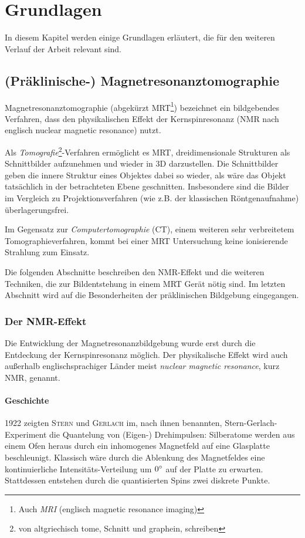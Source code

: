 \chapter{Grundlagen}
In diesem Kapitel werden einige Grundlagen erläutert, die für den weiteren Verlauf der Arbeit relevant sind.

\section{(Präklinische-) Magnetresonanztomographie}
Magnetresonanztomographie (abgekürzt MRT\footnote{Auch \textit{MRI} (englisch magnetic resonance imaging)}) bezeichnet ein bildgebendes Verfahren, dass den physikalischen Effekt der Kernspinresonanz (NMR nach englisch nuclear magnetic resonance) nutzt.

Als \textit{Tomografie}\footnote{von altgriechisch tome, Schnitt und graphein, schreiben}-Verfahren ermöglicht es MRT, dreidimensionale Strukturen als Schnittbilder aufzunehmen und wieder in 3D darzustellen. Die Schnittbilder geben die innere Struktur eines Objektes dabei so wieder, als wäre das Objekt tatsächlich in der betrachteten Ebene geschnitten. Insbesondere sind die Bilder im Vergleich zu Projektionsverfahren (wie z.B. der klassischen Röntgenaufnahme) überlagerungsfrei.

Im Gegensatz zur \textit{Computertomographie} (CT), einem weiteren sehr verbreitetem Tomographieverfahren, kommt bei einer MRT Untersuchung keine ionisierende Strahlung zum Einsatz.

Die folgenden Abschnitte beschreiben den NMR-Effekt und die weiteren Techniken, die zur Bildentstehung in einem MRT Gerät nötig sind. Im letzten Abschnitt wird auf die Besonderheiten der präklinischen Bildgebung eingegangen.

\subsection{Der NMR-Effekt}
Die Entwicklung der Magnetresonanzbildgebung wurde erst durch die Entdeckung der Kernspinresonanz möglich. Der physikalische Effekt wird auch außerhalb englischsprachiger Länder meist \textit{nuclear magnetic resonance}, kurz NMR, genannt.

\subsubsection{Geschichte}
1922 zeigten \textsc{Stern} und \textsc{Gerlach} im, nach ihnen benannten, Stern-Gerlach-Experiment die Quantelung von (Eigen-) Drehimpulsen: Silberatome werden aus einem Ofen heraus durch ein inhomogenes Magnetfeld auf eine Glasplatte beschleunigt. Klassisch wäre durch die Ablenkung des Magnetfeldes eine kontinuierliche Intensitäts-Verteilung um $0\degree$ auf der Platte zu erwarten. Stattdessen entstehen durch die quantisierten Spins zwei diskrete Punkte. \cite{Gerlach1922}

